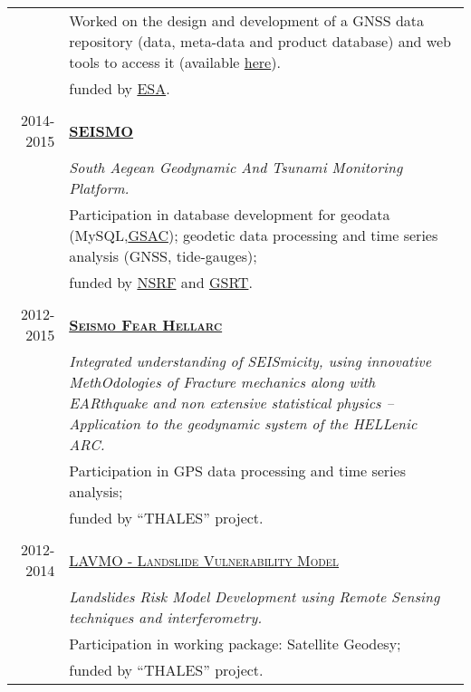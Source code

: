 \documentclass[9pt]{extarticle} %
\begin{document}
\begin{longtable}{r|p{13cm}}
  & Worked on the design and development of a GNSS data repository (data, meta-data and product database) and web tools to access it (available \href{http://ddrgsac.noa-gsp.terradue.com/ddrgsac}{here}).\\
  & funded by \href{http://www.esa.int/ESA}{ESA}.\\
%
\multicolumn{2}{c}{} \\
\textsc{2014-2015} & \textbf{\textsc{\href{http://dionysos.survey.ntua.gr/SEISMO/index.html}{SEISMO}}}\\
  & \textit{South Aegean Geodynamic And Tsunami Monitoring Platform.}\\
  & Participation in database development for geodata (MySQL,\href{http://www.unavco.org/software/data-management/gsac/gsac.html}{GSAC});
    geodetic data processing and time series analysis (GNSS, tide-gauges); \\
  & funded by \href{http://www.espa.gr/en/Pages/Default.aspx}{NSRF} and \href{http://www.gsrt.gr/central.aspx?sId=119I428I1089I323I488743}{GSRT}.\\
%
\multicolumn{2}{c}{} \\
\textsc{2012-2015} & \textbf{\textsc{\href{http://excellence.minedu.gov.gr/thales/en/thalesprojects/380208}{Seismo Fear Hellarc}}}\\
  & \textit{Integrated understanding of SEISmicity, using innovative MethOdologies of Fracture mechanics along with EARthquake and non extensive statistical physics – Application to the geodynamic system of the HELLenic ARC.}\\
  & Participation in GPS data processing and time series analysis;\\
  & funded by \textquotedblleft THALES\textquotedblright{} project.\\
%
\multicolumn{2}{c}{} \\ 
\textsc{2012-2014} & \textsc{\href{http://excellence.minedu.gov.gr/thales/en/thalesprojects/379347}{LAVMO - Landslide Vulnerability Model}}\\
  & \textit{Landslides Risk Model Development using Remote Sensing techniques and interferometry.}\\
  & Participation in working package: Satellite Geodesy;\\
  & funded by \textquotedblleft THALES\textquotedblright{} project.\\
%

\end{longtable}
\end{document}
